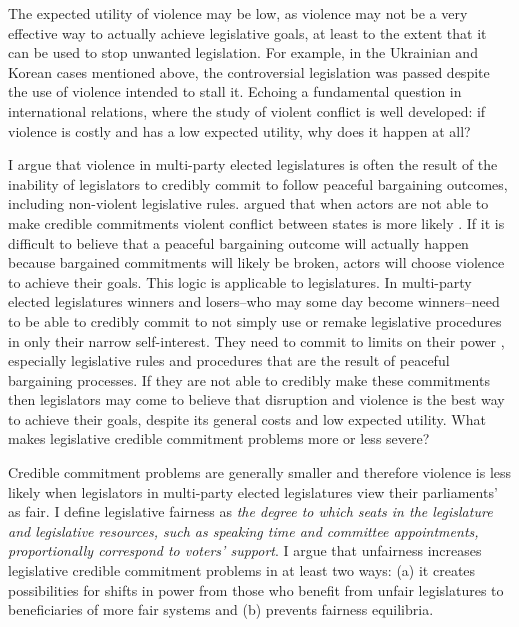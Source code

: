 \documentclass[a4paper]{article}\usepackage[]{graphicx}\usepackage[]{color}
\begin{document}
The expected utility of violence may be low, as violence may not be a very effective way to actually achieve legislative goals, at least to the extent that it can be used to stop unwanted legislation. For example, in the Ukrainian and Korean cases mentioned above, the controversial legislation was passed despite the use of violence intended to stall it. Echoing a fundamental question in international relations, where the study of violent conflict is well developed: if violence is costly and has a low expected utility, why does it happen at all? 

I argue that violence in multi-party elected legislatures is often the result of the inability of legislators to credibly commit to follow peaceful bargaining outcomes, including non-violent legislative rules. \cite{Fearon1995} argued that when actors are not able to make credible commitments violent conflict between states is more likely \cite[see also][]{Powell2006}. If it is difficult to believe that a peaceful bargaining outcome will actually happen because bargained commitments will likely be broken, actors will choose violence to achieve their goals. This logic is applicable to legislatures. In multi-party elected legislatures winners and losers--who may some day become winners--need to be able to credibly commit to not simply use or remake legislative procedures in only their narrow self-interest. They need to commit to limits on their power \citep{riker1982,Gaubatz1996}, especially legislative rules and procedures that are the result of peaceful bargaining processes. If they are not able to credibly make these commitments then legislators may come to believe that disruption and violence is the best way to achieve their goals, despite its general costs and low expected utility. What makes legislative credible commitment problems more or less severe? 

Credible commitment problems are generally smaller and therefore violence is less likely when legislators in multi-party elected legislatures view their parliaments' as fair. I define legislative fairness as \emph{the degree to which seats in the legislature and legislative resources, such as speaking time and committee appointments, proportionally correspond to voters' support}. I argue that unfairness increases legislative credible commitment problems in at least two ways: (a) it creates possibilities for shifts in power from those who benefit from unfair legislatures to beneficiaries of more fair systems and (b) prevents fairness equilibria.
\end{document}
